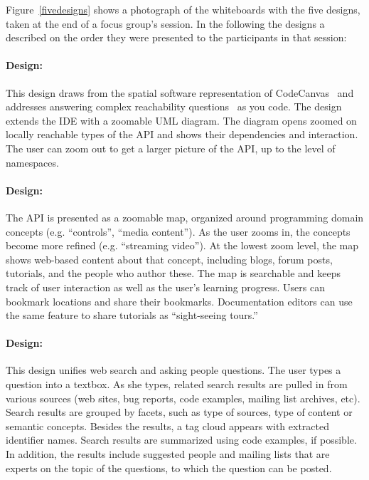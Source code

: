 Figure~\ref{fivedesigns} shows a photograph of the whiteboards with the five designs, taken at the end of a focus group's session. In the following the designs a described on the order they were presented to the participants in that session:

\moarsauce
\paragraph{Design: \ZoomableUML} 
This design draws from the spatial software representation of CodeCanvas~\cite{Deline2010a} and addresses answering complex reachability questions~\cite{Latoza2010a} as you code. The design extends the IDE with a zoomable UML diagram. The diagram opens zoomed on locally reachable types of the API and shows their dependencies and interaction. The user can zoom out to get a larger picture of the API, up to the level of namespaces.

\moarsauce
\paragraph{Design: \ConceptMap} 
The API is presented as a zoomable map, organized around programming domain concepts (e.g. ``controls'', ``media content''). As the user zooms in, the concepts become more refined (e.g. ``streaming video''). At the lowest zoom level, the map shows web-based content about that concept, including blogs, forum posts, tutorials, and the people who author these.
The map is searchable and keeps track of user interaction as well as the user's learning progress. Users can bookmark locations and share their bookmarks. Documentation editors can use the same feature to share tutorials as ``sight-seeing tours.''

\moarsauce
\paragraph{Design: \FacettedSearch}
This design unifies web search and asking people questions. The user types a question into a textbox. As she types, related  search results are pulled in from various sources (web sites, bug reports, code examples, mailing list archives, etc). Search results are grouped by facets, such as type of sources, type of content or semantic concepts. Besides the results, a tag cloud appears with extracted identifier names. Search results are summarized using code examples, if possible. In addition, the results include suggested people and mailing lists that are experts on the topic of the questions, to which the question can be posted.

